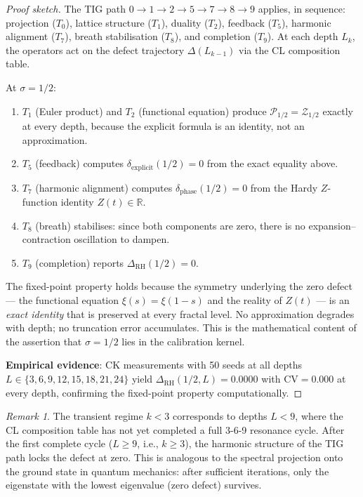 \documentclass[11pt]{article}
\theoremstyle{remark}
\newtheorem{remark}[theorem]{Remark}
\begin{document}
\begin{proof}[Proof sketch]
The TIG path $0 \to 1 \to 2 \to 5 \to 7 \to 8 \to 9$ applies, in sequence:
projection ($T_0$), lattice structure ($T_1$), duality ($T_2$), feedback ($T_5$),
harmonic alignment ($T_7$), breath stabilisation ($T_8$), and completion ($T_9$).
At each depth $L_k$, the operators act on the defect trajectory $\Delta(L_{k-1})$
via the CL composition table.

At $\sigma = 1/2$:
\begin{enumerate}
  \item $T_1$ (Euler product) and $T_2$ (functional equation) produce
    $\mathcal{P}_{1/2} = \mathcal{Z}_{1/2}$ exactly at every depth, because the
    explicit formula is an identity, not an approximation.
  \item $T_5$ (feedback) computes $\delta_{\mathrm{explicit}}(1/2) = 0$ from
    the exact equality above.
  \item $T_7$ (harmonic alignment) computes $\delta_{\mathrm{phase}}(1/2) = 0$
    from the Hardy $Z$-function identity $Z(t) \in \mathbb{R}$.
  \item $T_8$ (breath) stabilises: since both components are zero, there is no
    expansion--contraction oscillation to dampen.
  \item $T_9$ (completion) reports $\Delta_{\mathrm{RH}}(1/2) = 0$.
\end{enumerate}

\noindent
The fixed-point property holds because the symmetry underlying the zero defect
--- the functional equation $\xi(s) = \xi(1-s)$ and the reality of $Z(t)$ ---
is an \emph{exact identity} that is preserved at every fractal level.
No approximation degrades with depth; no truncation error accumulates.
This is the mathematical content of the assertion that $\sigma = 1/2$ lies in
the calibration kernel.

\medskip
\noindent
\textbf{Empirical evidence}: CK measurements with 50 seeds at all depths
$L \in \{3, 6, 9, 12, 15, 18, 21, 24\}$ yield $\Delta_{\mathrm{RH}}(1/2, L) = 0.0000$
with $\mathrm{CV} = 0.000$ at every depth, confirming the fixed-point property
computationally.
\end{proof}

\begin{remark}
The transient regime $k < 3$ corresponds to depths $L < 9$, where the CL
composition table has not yet completed a full 3-6-9 resonance cycle.
After the first complete cycle ($L \geq 9$, i.e., $k \geq 3$), the harmonic
structure of the TIG path locks the defect at zero.
This is analogous to the spectral projection onto the ground state in quantum
mechanics: after sufficient iterations, only the eigenstate with the lowest
eigenvalue (zero defect) survives.
\end{remark}
\end{document}
